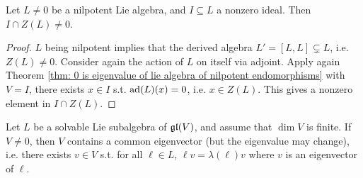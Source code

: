\documentclass{article}
\begin{document}
\begin{lemma}
    Let $L \neq 0$ be a nilpotent Lie algebra, and $I \subseteq L$ a nonzero ideal. Then $I \cap Z(L) \neq 0$.
\end{lemma}

\begin{proof}
    $L$ being nilpotent implies that the derived algebra $L' = [L, L] \subsetneq L$, i.e. $Z(L) \neq 0$. Consider again the action of $L$ on itself via adjoint. Apply again Theorem \ref{thm: 0 is eigenvalue of lie algebra of nilpotent endomorphisms} with $V = I$, there exists $x \in I$ s.t. $\operatorname{ad}(L)(x) = 0$, i.e. $x \in Z(L)$. This gives a nonzero element in $I \cap Z(L)$.
\end{proof}

\begin{theorem}\label{thm: solvable implies common eigenvector}
    Let $L$ be a solvable Lie subalgebra of $\mathfrak{gl}(V)$, and assume that $\dim V$ is finite. If $V \neq 0$, then $V$ contains a common eigenvector (but the eigenvalue may change), i.e. there exists $v \in V$ s.t. for all $\ell \in L$, $\ell v = \lambda(\ell) v$ where $v$ is an eigenvector of $\ell$.
\end{theorem}
\end{document}
